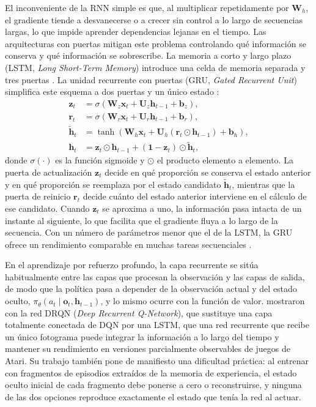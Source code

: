 El inconveniente de la RNN simple es que, al multiplicar repetidamente por $\mathbf{W}_h$, el gradiente tiende a desvanecerse o a crecer sin control a lo largo de secuencias largas, lo que impide aprender dependencias lejanas en el tiempo. Las arquitecturas con puertas mitigan este problema controlando qué información se conserva y qué información se sobrescribe. La memoria a corto y largo plazo (LSTM, \textit{Long Short-Term Memory}) introduce una celda de memoria separada y tres puertas \citep{hochreiter1997long}. La unidad recurrente con puertas (GRU, \textit{Gated Recurrent Unit}) simplifica este esquema a dos puertas y un único estado \citep{cho2014learning}:
\begin{equation}
\begin{aligned}
    \mathbf{z}_t &= \sigma\left( \mathbf{W}_z \mathbf{x}_t + \mathbf{U}_z \mathbf{h}_{t-1} + \mathbf{b}_z \right), \\
    \mathbf{r}_t &= \sigma\left( \mathbf{W}_r \mathbf{x}_t + \mathbf{U}_r \mathbf{h}_{t-1} + \mathbf{b}_r \right), \\
    \tilde{\mathbf{h}}_t &= \tanh\left( \mathbf{W}_h \mathbf{x}_t + \mathbf{U}_h \left( \mathbf{r}_t \odot \mathbf{h}_{t-1} \right) + \mathbf{b}_h \right), \\
    \mathbf{h}_t &= \mathbf{z}_t \odot \mathbf{h}_{t-1} + \left( \mathbf{1} - \mathbf{z}_t \right) \odot \tilde{\mathbf{h}}_t,
\end{aligned}
\end{equation}
donde $\sigma(\cdot)$ es la función sigmoide y $\odot$ el producto elemento a elemento. La puerta de actualización $\mathbf{z}_t$ decide en qué proporción se conserva el estado anterior y en qué proporción se reemplaza por el estado candidato $\tilde{\mathbf{h}}_t$, mientras que la puerta de reinicio $\mathbf{r}_t$ decide cuánto del estado anterior interviene en el cálculo de ese candidato. Cuando $\mathbf{z}_t$ se aproxima a uno, la información pasa intacta de un instante al siguiente, lo que facilita que el gradiente fluya a lo largo de la secuencia. Con un número de parámetros menor que el de la LSTM, la GRU ofrece un rendimiento comparable en muchas tareas secuenciales \citep{mienye2024recurrent}.

En el aprendizaje por refuerzo profundo, la capa recurrente se sitúa habitualmente entre las capas que procesan la observación y las capas de salida, de modo que la política pasa a depender de la observación actual y del estado oculto, $\pi_\theta(a_t \mid \mathbf{o}_t, \mathbf{h}_{t-1})$, y lo mismo ocurre con la función de valor. \citet{hausknecht2015deep} mostraron con la red DRQN (\textit{Deep Recurrent Q-Network}), que sustituye una capa totalmente conectada de DQN por una LSTM, que una red recurrente que recibe un único fotograma puede integrar la información a lo largo del tiempo y mantener su rendimiento en versiones parcialmente observables de juegos de Atari. Su trabajo también pone de manifiesto una dificultad práctica: al entrenar con fragmentos de episodios extraídos de la memoria de experiencia, el estado oculto inicial de cada fragmento debe ponerse a cero o reconstruirse, y ninguna de las dos opciones reproduce exactamente el estado que tenía la red al actuar.

